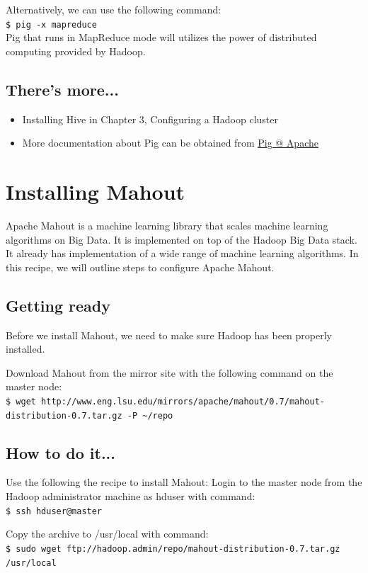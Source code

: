 Alternatively, we can use the following command: \\
\verb|$ pig -x mapreduce| \\
Pig that runs in MapReduce mode will utilizes the power of distributed computing provided by Hadoop.

\subsection*{There's more...}
\begin{itemize}
  \item Installing Hive in Chapter 3, Configuring a Hadoop cluster
  \item More documentation about Pig can be obtained from \href{http://pig.apache.org/docs/r0.10.0/}{Pig @ Apache}
\end{itemize}

\section{Installing Mahout}
Apache Mahout is a machine learning library that scales machine learning algorithms on Big Data. It is implemented on top of the Hadoop Big Data stack. It already has implementation of a wide range of machine learning algorithms. In this recipe, we will outline steps to configure Apache Mahout.
\subsection*{Getting ready}
Before we install Mahout, we need to make sure Hadoop has been properly installed.

Download Mahout from the mirror site with the following command on the master node:\\
\verb|$ wget http://www.eng.lsu.edu/mirrors/apache/mahout/0.7/mahout-distribution-0.7.tar.gz -P ~/repo|

\subsection*{How to do it...}
Use the following the recipe to install Mahout:
Login to the master node from the Hadoop administrator machine as hduser with command: \\
\verb|$ ssh hduser@master|

Copy the archive to /usr/local with command: \\
\verb|$ sudo wget ftp://hadoop.admin/repo/mahout-distribution-0.7.tar.gz /usr/local|

